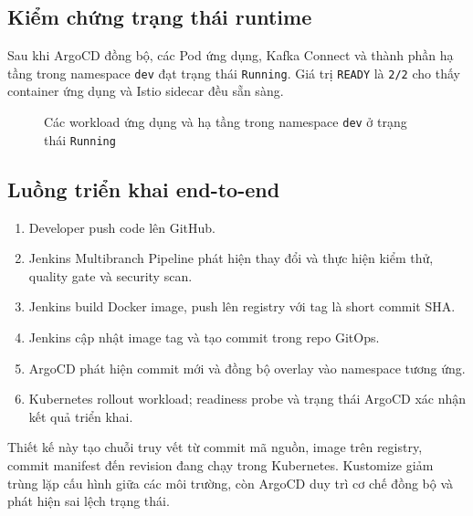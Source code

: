 \subsection{Kiểm chứng trạng thái runtime}

Sau khi ArgoCD đồng bộ, các Pod ứng dụng, Kafka Connect và thành phần hạ tầng trong namespace \texttt{dev} đạt trạng thái \texttt{Running}. Giá trị \texttt{READY} là \texttt{2/2} cho thấy container ứng dụng và Istio sidecar đều sẵn sàng.

\begin{figure}[H]
\centering
{}
\caption{Các workload ứng dụng và hạ tầng trong namespace \texttt{dev} ở trạng thái \texttt{Running}}
\end{figure}

\subsection{Luồng triển khai end-to-end}

\begin{enumerate}
\item Developer push code lên GitHub.
\item Jenkins Multibranch Pipeline phát hiện thay đổi và thực hiện kiểm thử, quality gate và security scan.
\item Jenkins build Docker image, push lên registry với tag là short commit SHA.
\item Jenkins cập nhật image tag và tạo commit trong repo GitOps.
\item ArgoCD phát hiện commit mới và đồng bộ overlay vào namespace tương ứng.
\item Kubernetes rollout workload; readiness probe và trạng thái ArgoCD xác nhận kết quả triển khai.
\end{enumerate}

Thiết kế này tạo chuỗi truy vết từ commit mã nguồn, image trên registry, commit manifest đến revision đang chạy trong Kubernetes. Kustomize giảm trùng lặp cấu hình giữa các môi trường, còn ArgoCD duy trì cơ chế đồng bộ và phát hiện sai lệch trạng thái.
